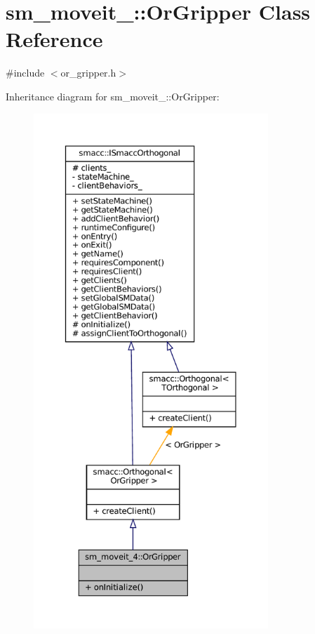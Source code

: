 \hypertarget{classsm__moveit__4_1_1OrGripper}{}\section{sm\+\_\+moveit\+\_\+:\+:Or\+Gripper Class Reference}
\label{classsm__moveit__4_1_1OrGripper}


{\ttfamily \#include $<$or\+\_\+gripper.\+h$>$}



Inheritance diagram for sm\+\_\+moveit\+\_\+:\+:Or\+Gripper\+:
\nopagebreak
\begin{figure}[H]
\begin{center}
\leavevmode
\includegraphics[height=550pt]{classsm__moveit__4_1_1OrGripper__inherit__graph}
\end{center}
\end{figure}


